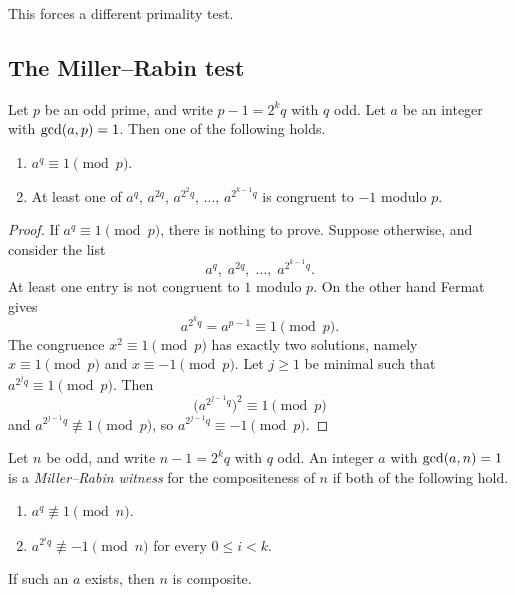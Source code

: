 This forces a different primality test.

\subsection{The Miller--Rabin test}

\begin{keybox}
\begin{proposition}
Let \(p\) be an odd prime, and write \(p-1=2^{k}q\) with \(q\) odd. Let \(a\) be an integer with \(\operatorname{gcd}(a,p)=1\). Then one of the following holds.
\begin{enumerate}[label=\textup{(\roman*)}, leftmargin=1.6em]
    \item \(a^{q}\equiv 1\pmod{p}\).
    \item At least one of
    \(a^{q},\, a^{2q},\, a^{2^{2}q},\, \ldots,\, a^{2^{k-1}q}\)
    is congruent to \(-1\) modulo \(p\).
\end{enumerate}
\end{proposition}
\end{keybox}

\begin{proof}
If \(a^{q}\equiv 1\pmod{p}\), there is nothing to prove. Suppose otherwise, and consider the list
\[
    a^{q},\; a^{2q},\; \ldots,\; a^{2^{k-1}q}.
\]
At least one entry is not congruent to \(1\) modulo \(p\). On the other hand Fermat gives
\[
    a^{2^{k}q}=a^{p-1}\equiv 1\pmod{p}.
\]
The congruence \(x^{2}\equiv 1\pmod{p}\) has exactly two solutions, namely \(x\equiv 1\pmod{p}\) and \(x\equiv -1\pmod{p}\). Let \(j\ge 1\) be minimal such that \(a^{2^{j}q}\equiv 1\pmod{p}\). Then
\[
    \bigl(a^{2^{j-1}q}\bigr)^{2}\equiv 1\pmod{p}
\]
and \(a^{2^{j-1}q}\not\equiv 1\pmod{p}\), so \(a^{2^{j-1}q}\equiv -1\pmod{p}\).
\end{proof}


\begin{definition}
Let \(n\) be odd, and write \(n-1=2^{k}q\) with \(q\) odd. An integer \(a\) with \(\operatorname{gcd}(a,n)=1\) is a \emph{Miller--Rabin witness} for the compositeness of \(n\) if both of the following hold.
\begin{enumerate}[label=\textup{(\roman*)}, leftmargin=1.6em]
    \item \(a^{q}\not\equiv 1\pmod{n}\).
    \item \(a^{2^{i}q}\not\equiv -1\pmod{n}\) for every \(0\le i<k\).
\end{enumerate}
If such an \(a\) exists, then \(n\) is composite.
\end{definition}

